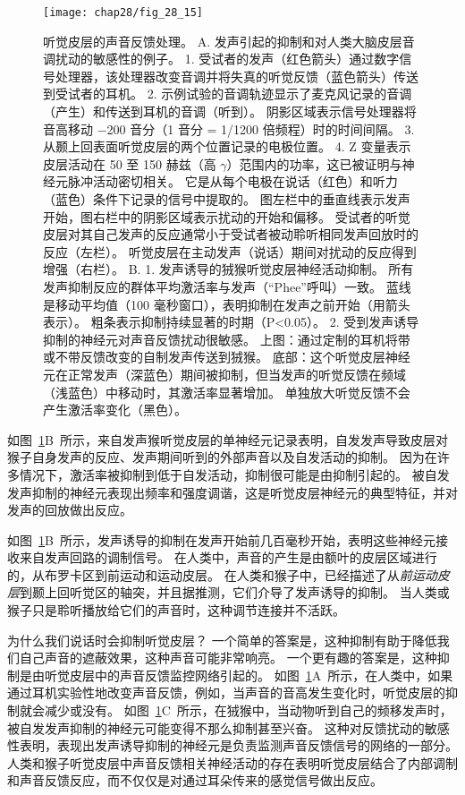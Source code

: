 \begin{figure}[htbp]
	\centering
	\texttt{[image: chap28/fig\_28\_15]}
	\caption{听觉皮层的声音反馈处理。
		A. 发声引起的抑制和对人类大脑皮层音调扰动的敏感性的例子。
	1. 受试者的发声（红色箭头）通过数字信号处理器，该处理器改变音调并将失真的听觉反馈（蓝色箭头）传送到受试者的耳机。 
	2. 示例试验的音调轨迹显示了麦克风记录的音调（产生）和传送到耳机的音调（听到）。
	阴影区域表示信号处理器将音高移动 −200 音分（1 音分 = 1/1200 倍频程）时的时间间隔。
	3. 从颞上回表面听觉皮层的两个位置记录的电极位置。
	4. Z 变量表示皮层活动在 50 至 150 赫兹（高 $\gamma$）范围内的功率，这已被证明与神经元脉冲活动密切相关。 
	它是从每个电极在说话（红色）和听力（蓝色）条件下记录的信号中提取的。
	图左栏中的垂直线表示发声开始，图右栏中的阴影区域表示扰动的开始和偏移。
	受试者的听觉皮层对其自己发声的反应通常小于受试者被动聆听相同发声回放时的反应（左栏）。 
	听觉皮层在主动发声（说话）期间对扰动的反应得到增强（右栏）\cite{houde2015cortical}。
	B. 1. 发声诱导的狨猴听觉皮层神经活动抑制。 
	所有发声抑制反应的群体平均激活率与发声（“Phee”呼叫）一致。 
	蓝线是移动平均值（100 毫秒窗口），表明抑制在发声之前开始（用箭头表示）。 
	粗条表示抑制持续显著的时期（P<0.05）\cite{eliades2003sensory}。
	2. 受到发声诱导抑制的神经元对声音反馈扰动很敏感。
	上图：通过定制的耳机将带或不带反馈改变的自制发声传送到狨猴。
	底部：这个听觉皮层神经元在正常发声（深蓝色）期间被抑制，但当发声的听觉反馈在频域（浅蓝色）中移动时，其激活率显著增加。
	单独放大听觉反馈不会产生激活率变化（黑色）\cite{eliades2008neural}。}
	\label{fig:28_15}
\end{figure}


如图~\ref{fig:28_15}B~所示，来自发声猴听觉皮层的单神经元记录表明，自发发声导致皮层对猴子自身发声的反应、发声期间听到的外部声音以及自发活动的抑制。
因为在许多情况下，激活率被抑制到低于自发活动，抑制很可能是由抑制引起的。
被自发发声抑制的神经元表现出频率和强度调谐，这是听觉皮层神经元的典型特征，并对发声的回放做出反应。


如图~\ref{fig:28_15}B~所示，发声诱导的抑制在发声开始前几百毫秒开始，表明这些神经元接收来自发声回路的调制信号。
在人类中，声音的产生是由额叶的皮层区域进行的，从布罗卡区到前运动和运动皮层。
在人类和猴子中，已经描述了从\textit{前运动皮层}到颞上回听觉区的轴突，并且据推测，它们介导了发声诱导的抑制。
当人类或猴子只是聆听播放给它们的声音时，这种调节连接并不活跃。


为什么我们说话时会抑制听觉皮层？
一个简单的答案是，这种抑制有助于降低我们自己声音的遮蔽效果，这种声音可能非常响亮。
一个更有趣的答案是，这种抑制是由听觉皮层中的声音反馈监控网络引起的。
如图~\ref{fig:28_15}A~所示，在人类中，如果通过耳机实验性地改变声音反馈，例如，当声音的音高发生变化时，听觉皮层的抑制就会减少或没有。
如图~\ref{fig:28_15}C~所示，在狨猴中，当动物听到自己的频移发声时，被自发发声抑制的神经元可能变得不那么抑制甚至兴奋。
这种对反馈扰动的敏感性表明，表现出发声诱导抑制的神经元是负责监测声音反馈信号的网络的一部分。
人类和猴子听觉皮层中声音反馈相关神经活动的存在表明听觉皮层结合了内部调制和声音反馈反应，而不仅仅是对通过耳朵传来的感觉信号做出反应。


